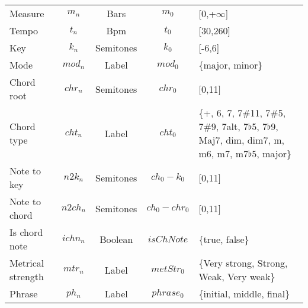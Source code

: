 \begin{table}
{\begin{tabular}{l c c c p{2.5cm} }
    Measure & $m_n$ & Bars & $m_0$ & [0,+$\infty$] \\
    Tempo & $t_n$ & Bpm & $t_0$ & [30,260] \\
    Key & $k_n$ & Semitones & $k_0$ & [-6,6] \\
 	Mode & $mod_n$ & Label & $mod_0$ & \{major, minor\} \\
 	Chord root & $chr_n$ & Semitones & $chr_0$ & [0,11] \\
    Chord type & $cht_n$ & Label & $cht_0$  & \{+, 6, 7, 7\#11, 7\#5, 7\#9, 7alt, 7$\flat$5, 7$\flat$9, Maj7, dim, dim7, m, m6, m7, m7$\flat$5, major\} \\
    Note to key & $n2k_n$ & Semitones & $ch_0-k_0$ & [0,11] \\
	Note to chord & $n2ch_n$ & Semitones & $ch_0-chr_0$ & [0,11] \\
 	Is chord note & $ichn_n$ & Boolean & $isChNote$ & \{true, false\} \\
 	Metrical strength & $mtr_n$ & Label & $metStr_0$ & \{Very strong, Strong, Weak, Very weak\} \\
 	Phrase & $ph_n$ & Label & $phrase_0$ & \{initial, middle, final\} \\
 

    \hline

  \end{tabular}
  }
\end{table}
